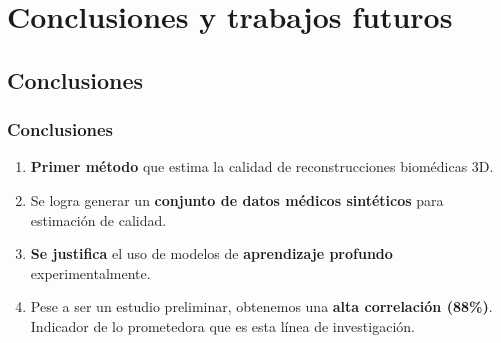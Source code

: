 \section{Conclusiones y trabajos futuros}
\subsection{Conclusiones}

\begin{frame}
  \frametitle{Conclusiones}
  \begin{enumerate}
    \item \textbf{Primer método} que estima la calidad de reconstrucciones biomédicas 3D.
    \item Se logra generar un \textbf{conjunto de datos médicos sintéticos } para estimación de calidad.
    \item \textbf{Se justifica} el uso de modelos de \textbf{aprendizaje profundo} \alert{experimentalmente}.
    \item Pese a ser un estudio preliminar, obtenemos una \textbf{alta correlación (88\%)}. Indicador 
      de lo prometedora que es esta línea de investigación.
  \end{enumerate}
\end{frame}

